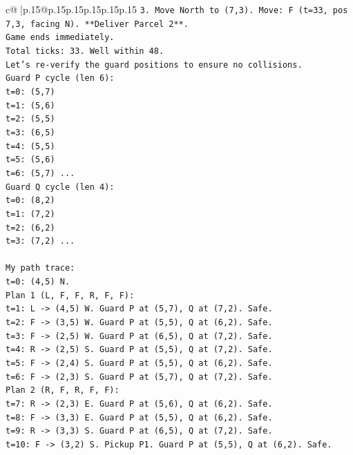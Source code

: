 \documentclass{article}
\begin{document}
{\begin{supertabular}{c@{$\;$}|p{.15\linewidth}@{}p{.15\linewidth}p{.15\linewidth}p{.15\linewidth}p{.15\linewidth}p{.15\linewidth}}
{{{\texttt{3. Move North to (7,3). Move: F (t=33, pos 7,3, facing N). **Deliver Parcel 2**.} \\
\texttt{Game ends immediately.} \\
\texttt{Total ticks: 33. Well within 48.} \\
\texttt{Let's re{-}verify the guard positions to ensure no collisions.} \\
\texttt{Guard P cycle (len 6):} \\
\texttt{t=0: (5,7)} \\
\texttt{t=1: (5,6)} \\
\texttt{t=2: (5,5)} \\
\texttt{t=3: (6,5)} \\
\texttt{t=4: (5,5)} \\
\texttt{t=5: (5,6)} \\
\texttt{t=6: (5,7) ...} \\
\texttt{Guard Q cycle (len 4):} \\
\texttt{t=0: (8,2)} \\
\texttt{t=1: (7,2)} \\
\texttt{t=2: (6,2)} \\
\texttt{t=3: (7,2) ...} \\
\\ 
\texttt{My path trace:} \\
\texttt{t=0: (4,5) N.} \\
\texttt{Plan 1 (L, F, F, R, F, F):} \\
\texttt{t=1: L {-}> (4,5) W. Guard P at (5,7), Q at (7,2). Safe.} \\
\texttt{t=2: F {-}> (3,5) W. Guard P at (5,5), Q at (6,2). Safe.} \\
\texttt{t=3: F {-}> (2,5) W. Guard P at (6,5), Q at (7,2). Safe.} \\
\texttt{t=4: R {-}> (2,5) S. Guard P at (5,5), Q at (7,2). Safe.} \\
\texttt{t=5: F {-}> (2,4) S. Guard P at (5,5), Q at (6,2). Safe.} \\
\texttt{t=6: F {-}> (2,3) S. Guard P at (5,7), Q at (7,2). Safe.} \\
\texttt{Plan 2 (R, F, R, F, F):} \\
\texttt{t=7: R {-}> (2,3) E. Guard P at (5,6), Q at (6,2). Safe.} \\
\texttt{t=8: F {-}> (3,3) E. Guard P at (5,5), Q at (6,2). Safe.} \\
\texttt{t=9: R {-}> (3,3) S. Guard P at (6,5), Q at (7,2). Safe.} \\
\texttt{t=10: F {-}> (3,2) S. Pickup P1. Guard P at (5,5), Q at (6,2). Safe.} \\
}}}
\end{supertabular}}
\end{document}
